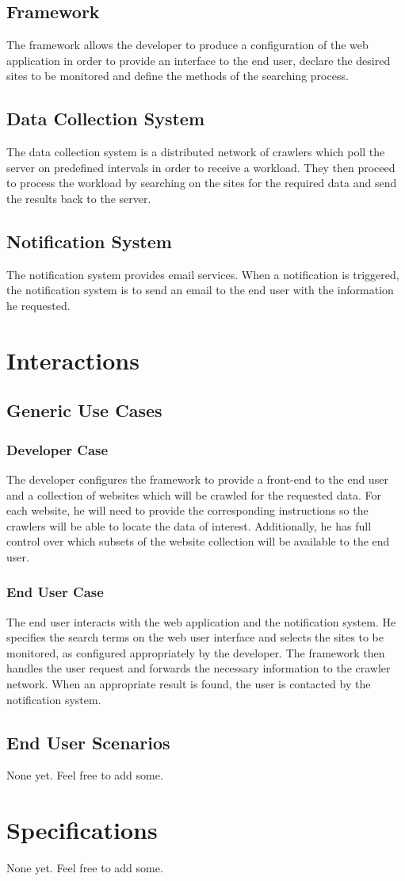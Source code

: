\documentclass[a4paper,10pt]{article} \usepackage{anysize}
\begin{document}
    \subsection{Framework}
        The framework allows the developer to produce a configuration of the
        web application in order to provide an interface to the end user,
        declare the desired sites to be monitored and define the methods of
        the searching process.
    \subsection{Data Collection System}
        The data collection system is a distributed network of crawlers which
        poll the server on predefined intervals in order to receive a
        workload. They then proceed to process the workload by searching on
        the sites for the required data and send the results back to the
        server.
    \subsection{Notification System}
        The notification system provides email services. When a notification
        is triggered, the notification system is to send an email to the end
        user with the information he requested.
\section{Interactions}
    \subsection{Generic Use Cases}
        \subsubsection{Developer Case}
            The developer configures the framework to provide a front-end to
            the end user and a collection of websites which will be crawled
            for the requested data. For each website, he will need to provide
            the corresponding instructions so the crawlers will be able to
            locate the data of interest. Additionally, he has full control
            over which subsets of the website collection will be available to
            the end user.
        \subsubsection{End User Case}
            The end user interacts with the web application and the
            notification system. He specifies the search terms on the web user
            interface and selects the sites to be monitored, as configured
            appropriately by the developer. The framework then handles the
            user request and forwards the necessary information to the crawler
            network. When an appropriate result is found, the user is contacted
            by the notification system.

    \subsection{End User Scenarios}
        None yet. Feel free to add some.

\section{Specifications}
    None yet. Feel free to add some.
\end{document}
